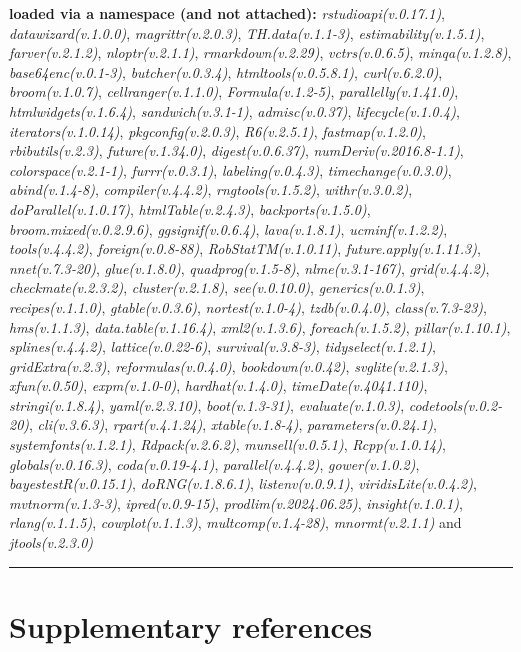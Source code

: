 \documentclass[
  bookmarksnumbered]{article}
\begin{document}
\textbf{loaded via a namespace (and not attached):}
\emph{rstudioapi(v.0.17.1)}, \emph{datawizard(v.1.0.0)}, \emph{magrittr(v.2.0.3)}, \emph{TH.data(v.1.1-3)}, \emph{estimability(v.1.5.1)}, \emph{farver(v.2.1.2)}, \emph{nloptr(v.2.1.1)}, \emph{rmarkdown(v.2.29)}, \emph{vctrs(v.0.6.5)}, \emph{minqa(v.1.2.8)}, \emph{base64enc(v.0.1-3)}, \emph{butcher(v.0.3.4)}, \emph{htmltools(v.0.5.8.1)}, \emph{curl(v.6.2.0)}, \emph{broom(v.1.0.7)}, \emph{cellranger(v.1.1.0)}, \emph{Formula(v.1.2-5)}, \emph{parallelly(v.1.41.0)}, \emph{htmlwidgets(v.1.6.4)}, \emph{sandwich(v.3.1-1)}, \emph{admisc(v.0.37)}, \emph{lifecycle(v.1.0.4)}, \emph{iterators(v.1.0.14)}, \emph{pkgconfig(v.2.0.3)}, \emph{R6(v.2.5.1)}, \emph{fastmap(v.1.2.0)}, \emph{rbibutils(v.2.3)}, \emph{future(v.1.34.0)}, \emph{digest(v.0.6.37)}, \emph{numDeriv(v.2016.8-1.1)}, \emph{colorspace(v.2.1-1)}, \emph{furrr(v.0.3.1)}, \emph{labeling(v.0.4.3)}, \emph{timechange(v.0.3.0)}, \emph{abind(v.1.4-8)}, \emph{compiler(v.4.4.2)}, \emph{rngtools(v.1.5.2)}, \emph{withr(v.3.0.2)}, \emph{doParallel(v.1.0.17)}, \emph{htmlTable(v.2.4.3)}, \emph{backports(v.1.5.0)}, \emph{broom.mixed(v.0.2.9.6)}, \emph{ggsignif(v.0.6.4)}, \emph{lava(v.1.8.1)}, \emph{ucminf(v.1.2.2)}, \emph{tools(v.4.4.2)}, \emph{foreign(v.0.8-88)}, \emph{RobStatTM(v.1.0.11)}, \emph{future.apply(v.1.11.3)}, \emph{nnet(v.7.3-20)}, \emph{glue(v.1.8.0)}, \emph{quadprog(v.1.5-8)}, \emph{nlme(v.3.1-167)}, \emph{grid(v.4.4.2)}, \emph{checkmate(v.2.3.2)}, \emph{cluster(v.2.1.8)}, \emph{see(v.0.10.0)}, \emph{generics(v.0.1.3)}, \emph{recipes(v.1.1.0)}, \emph{gtable(v.0.3.6)}, \emph{nortest(v.1.0-4)}, \emph{tzdb(v.0.4.0)}, \emph{class(v.7.3-23)}, \emph{hms(v.1.1.3)}, \emph{data.table(v.1.16.4)}, \emph{xml2(v.1.3.6)}, \emph{foreach(v.1.5.2)}, \emph{pillar(v.1.10.1)}, \emph{splines(v.4.4.2)}, \emph{lattice(v.0.22-6)}, \emph{survival(v.3.8-3)}, \emph{tidyselect(v.1.2.1)}, \emph{gridExtra(v.2.3)}, \emph{reformulas(v.0.4.0)}, \emph{bookdown(v.0.42)}, \emph{svglite(v.2.1.3)}, \emph{xfun(v.0.50)}, \emph{expm(v.1.0-0)}, \emph{hardhat(v.1.4.0)}, \emph{timeDate(v.4041.110)}, \emph{stringi(v.1.8.4)}, \emph{yaml(v.2.3.10)}, \emph{boot(v.1.3-31)}, \emph{evaluate(v.1.0.3)}, \emph{codetools(v.0.2-20)}, \emph{cli(v.3.6.3)}, \emph{rpart(v.4.1.24)}, \emph{xtable(v.1.8-4)}, \emph{parameters(v.0.24.1)}, \emph{systemfonts(v.1.2.1)}, \emph{Rdpack(v.2.6.2)}, \emph{munsell(v.0.5.1)}, \emph{Rcpp(v.1.0.14)}, \emph{globals(v.0.16.3)}, \emph{coda(v.0.19-4.1)}, \emph{parallel(v.4.4.2)}, \emph{gower(v.1.0.2)}, \emph{bayestestR(v.0.15.1)}, \emph{doRNG(v.1.8.6.1)}, \emph{listenv(v.0.9.1)}, \emph{viridisLite(v.0.4.2)}, \emph{mvtnorm(v.1.3-3)}, \emph{ipred(v.0.9-15)}, \emph{prodlim(v.2024.06.25)}, \emph{insight(v.1.0.1)}, \emph{rlang(v.1.1.5)}, \emph{cowplot(v.1.1.3)}, \emph{multcomp(v.1.4-28)}, \emph{mnormt(v.2.1.1)} and \emph{jtools(v.2.3.0)}

\begin{center}\rule{0.5\linewidth}{0.5pt}\end{center}

\section{Supplementary references}\label{refs}

\begin{multicols}{2}
\AtNextBibliography{\footnotesize}
\printbibliography[heading=none]
\normalsize
\end{multicols}

\def\printbibliography{}

\printbibliography
\end{document}
